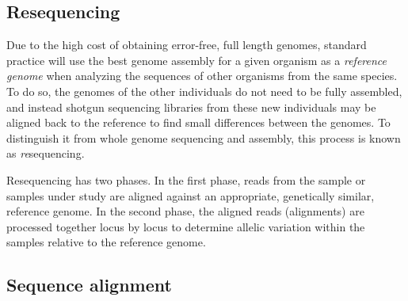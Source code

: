\subsection{Resequencing}
\label{sec:resequencing}

Due to the high cost of obtaining error-free, full length genomes, standard practice will use the best genome assembly for a given organism as a \emph{reference genome} when analyzing the sequences of other organisms from the same species.
To do so, the genomes of the other individuals do not need to be fully assembled, and instead shotgun sequencing libraries from these new individuals may be aligned back to the reference to find small differences between the genomes.
To distinguish it from whole genome sequencing and assembly, this process is known as \emph{re}sequencing.

Resequencing has two phases.
In the first phase, reads from the sample or samples under study are aligned against an appropriate, genetically similar, reference genome.
In the second phase, the aligned reads (alignments) are processed together locus by locus to determine allelic variation within the samples relative to the reference genome.

\subsection{Sequence alignment}
\label{sec:sequence_alignment}

